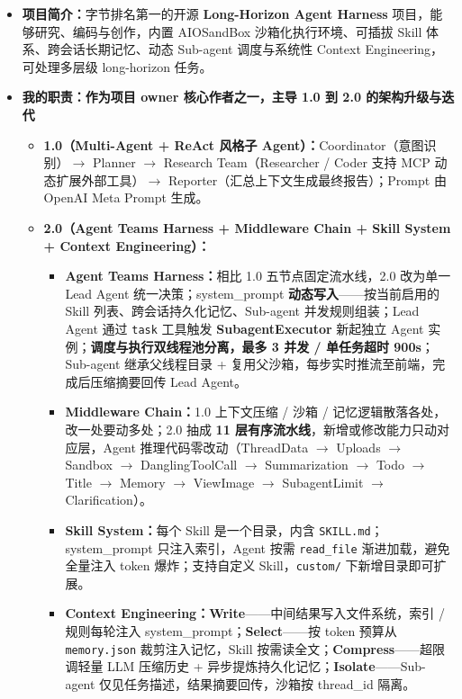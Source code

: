 \documentclass[12pt,a3paper,fontset=none]{ctexart}
\newcommand{\code}[1]{\texttt{\fontsize{10.8pt}{12pt}\selectfont #1}}
\begin{document}
\begin{itemize}
  \item \textbf{项目简介：}字节排名第一的开源 \textbf{Long-Horizon Agent Harness} 项目，能够研究、编码与创作，内置 AIOSandBox 沙箱化执行环境、可插拔 Skill 体系、跨会话长期记忆、动态 Sub-agent 调度与系统性 Context Engineering，可处理多层级 long-horizon 任务。
  \item \textbf{我的职责：作为项目 owner 核心作者之一，主导 1.0 到 2.0 的架构升级与迭代}
  \begin{itemize}
    \item \textbf{1.0（Multi-Agent + ReAct 风格子 Agent）：}Coordinator（意图识别）$\rightarrow$ Planner $\rightarrow$ Research Team（Researcher / Coder 支持 MCP 动态扩展外部工具）$\rightarrow$ Reporter（汇总上下文生成最终报告）；Prompt 由 OpenAI Meta Prompt 生成。
    \item \textbf{2.0（Agent Teams Harness + Middleware Chain + Skill System + Context Engineering）：}
    \begin{itemize}
      \item \textbf{Agent Teams Harness：}相比 1.0 五节点固定流水线，2.0 改为单一 Lead Agent 统一决策；system\_prompt \textbf{动态写入}——按当前启用的 Skill 列表、跨会话持久化记忆、Sub-agent 并发规则组装；Lead Agent 通过 \code{task} 工具触发 \textbf{SubagentExecutor} 新起独立 Agent 实例；\textbf{调度与执行双线程池分离，最多 3 并发 / 单任务超时 900s}；Sub-agent 继承父线程目录 + 复用父沙箱，每步实时推流至前端，完成后压缩摘要回传 Lead Agent。
      \item \textbf{Middleware Chain：}1.0 上下文压缩 / 沙箱 / 记忆逻辑散落各处，改一处要动多处；2.0 抽成 \textbf{11 层有序流水线}，新增或修改能力只动对应层，Agent 推理代码零改动（ThreadData $\rightarrow$ Uploads $\rightarrow$ Sandbox $\rightarrow$ DanglingToolCall $\rightarrow$ Summarization $\rightarrow$ Todo $\rightarrow$ Title $\rightarrow$ Memory $\rightarrow$ ViewImage $\rightarrow$ SubagentLimit $\rightarrow$ Clarification）。
      \item \textbf{Skill System：}每个 Skill 是一个目录，内含 \code{SKILL.md}；system\_prompt 只注入索引，Agent 按需 \code{read\_file} 渐进加载，避免全量注入 token 爆炸；支持自定义 Skill，\code{custom/} 下新增目录即可扩展。
      \item \textbf{Context Engineering：Write}——中间结果写入文件系统，索引 / 规则每轮注入 system\_prompt；\textbf{Select}——按 token 预算从 \code{memory.json} 裁剪注入记忆，Skill 按需读全文；\textbf{Compress}——超限调轻量 LLM 压缩历史 + 异步提炼持久化记忆；\textbf{Isolate}——Sub-agent 仅见任务描述，结果摘要回传，沙箱按 thread\_id 隔离。
    \end{itemize}
  \end{itemize}
\end{itemize}
\end{document}
